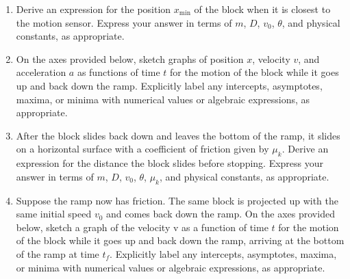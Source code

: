 \documentclass{../../../oss-apphys}
\begin{document}
\begin{enumerate}[leftmargin=15pt]
\begin{enumerate}[leftmargin=15pt]
  \item Derive an expression for the position $x_\mathrm{min}$ of the block when
    it is closest to the motion sensor. Express your answer in terms of $m$,
    $D$, $v_0$, $\theta$, and physical constants, as appropriate.
    \vspace{1in}
  \item On the axes provided below, sketch graphs of position $x$, velocity
    $v$, and acceleration $a$ as functions of time $t$ for the motion of the
    block while it goes up and back down the ramp. Explicitly label any
    intercepts, asymptotes, maxima, or minima with numerical values or
    algebraic expressions, as appropriate.
    \begin{center}
      \hspace{.3in}
      \hspace{.3in}
    \end{center}
  \item After the block slides back down and leaves the bottom of the ramp, it
    slides on a horizontal surface with a coefficient of friction given by
    $\mu_k$. Derive an expression for the distance the block slides before
    stopping. Express your answer in terms of $m$, $D$, $v_0$, $\theta$,
    $\mu_k$, and physical constants, as appropriate.
    \vspace{1in}

  \item Suppose the ramp now has friction. The same block is projected up with
    the same initial speed $v_0$ and comes back down the ramp. On the axes
    provided below, sketch a graph of the velocity v as a function of time $t$
    for the motion of the block while it goes up and back down the ramp,
    arriving at the bottom of the ramp at time $t_f$. Explicitly label any
    intercepts, asymptotes, maxima, or minima with numerical values or
    algebraic expressions, as appropriate.
    

\end{enumerate}
\end{enumerate}
\end{document}
